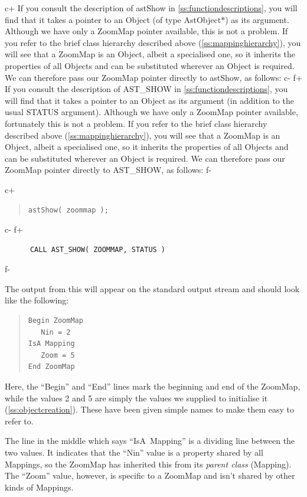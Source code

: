 \documentclass[twoside,11pt]{article}
\newcommand{\appref}[1]{Appendix~\ref{#1}}
\newcommand{\secref}[1]{\S\ref{#1}}
\renewcommand{\appref}[1]{\ref{#1}}
\renewcommand{\secref}[1]{\ref{#1}}
\begin{document}
c+
If you consult the description of astShow in
\appref{ss:functiondescriptions}, you will find that it takes a
pointer to an Object (of type AstObject$*$) as its argument. Although
we have only a ZoomMap pointer available, this is not a problem. If
you refer to the brief class hierarchy described above
(\secref{ss:mappinghierarchy}), you will see that a ZoomMap is an
Object, albeit a specialised one, so it inherits the properties of all
Objects and can be substituted wherever an Object is required.  We can
therefore pass our ZoomMap pointer directly to astShow, as follows:
c-
f+
If you consult the description of AST\_SHOW in
\appref{ss:functiondescriptions}, you will find that it takes a
pointer to an Object as its argument (in addition to the usual STATUS
argument). Although we have only a ZoomMap pointer available,
fortunately this is not a problem. If you refer to the brief class
hierarchy described above (\secref{ss:mappinghierarchy}), you will see
that a ZoomMap is an Object, albeit a specialised one, so it inherits
the properties of all Objects and can be substituted wherever an
Object is required.  We can therefore pass our ZoomMap pointer
directly to AST\_SHOW, as follows:
f-

c+
\begin{quote}
\small
\begin{verbatim}
astShow( zoommap );
\end{verbatim}
\normalsize
\end{quote}
c-
f+
\small
\begin{verbatim}
      CALL AST_SHOW( ZOOMMAP, STATUS )
\end{verbatim}
\normalsize
f-

The output from this will appear on the standard output stream and
should look like the following:

\begin{quote}
\small
\begin{verbatim}
Begin ZoomMap
   Nin = 2
IsA Mapping
   Zoom = 5
End ZoomMap
\end{verbatim}
\normalsize
\end{quote}

Here, the ``Begin'' and ``End'' lines mark the beginning and end of
the ZoomMap, while the values 2 and 5 are simply the values we
supplied to initialise it (\secref{ss:objectcreation}). These have
been given simple names to make them easy to refer to.

The line in the middle which says ``IsA~Mapping'' is a dividing line
between the two values. It indicates that the ``Nin'' value is a
property shared by all Mappings, so the ZoomMap has inherited this
from its {\em{parent class}} (Mapping). The ``Zoom'' value, however,
is specific to a ZoomMap and isn't shared by other kinds of Mappings.
\end{document}
